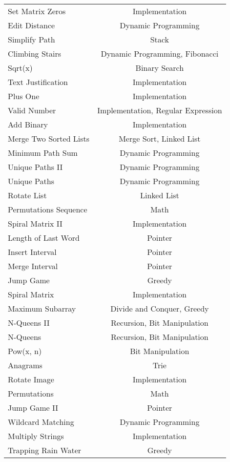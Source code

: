 \documentclass[paper=a4, fontsize=11pt]{scrartcl} %
\begin{document}
\begin{center}
\begin{longtable}{|l|c|}
    Set Matrix Zeros    &   Implementation  \\
    Edit Distance   &   Dynamic Programming \\
    Simplify Path   &   Stack   \\
    Climbing Stairs &   Dynamic Programming, Fibonacci  \\
    Sqrt(x) &   Binary Search   \\
    Text Justification  &   Implementation  \\
    Plus One    &   Implementation  \\
    Valid Number    &   Implementation, Regular Expression   \\
    Add Binary  &   Implementation  \\
    Merge Two Sorted Lists  &   Merge Sort, Linked List \\
    Minimum Path Sum  & Dynamic Programming \\
    Unique Paths II & Dynamic Programming  \\
    Unique Paths & Dynamic Programming  \\
    Rotate List & Linked List \\
    Permutations Sequence & Math  \\
    Spiral Matrix II  & Implementation  \\
    Length of Last Word & Pointer \\
    Insert Interval & Pointer \\
    Merge Interval  & Pointer \\
    Jump Game & Greedy  \\
    Spiral Matrix & Implementation  \\
    Maximum Subarray    &   Divide and Conquer, Greedy  \\
    N-Queens II    &   Recursion, Bit Manipulation \\
    N-Queens    &   Recursion, Bit Manipulation \\
    Pow(x, n)   &   Bit Manipulation    \\
    Anagrams    &   Trie    \\
    Rotate Image    &   Implementation  \\
    Permutations    &   Math    \\
    Jump Game II    &   Pointer\\
    Wildcard Matching   &   Dynamic Programming \\
    Multiply Strings    &   Implementation  \\
    Trapping Rain Water     &   Greedy  \\

\end{longtable}
\end{center}
\end{document}
